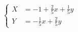 \begin{displaymath}
\left\lbrace  
\begin{aligned}
  X &= -1 + \frac{2}{5}x + \frac{1}{5}y \\
  Y &= -\frac{1}{5}x + \frac{2}{5}y
\end{aligned}
\right. 
\end{displaymath}
